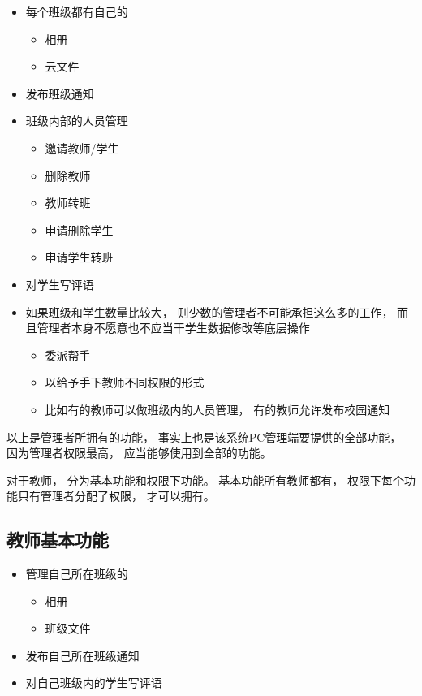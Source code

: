 \begin{itemize}
\item 每个班级都有自己的
\begin{itemize}
	\item 相册
	\item 云文件
\end{itemize}


\item 发布班级通知

\item 班级内部的人员管理

\begin{itemize}
	\item 邀请教师/学生
	\item 删除教师
	\item 教师转班
	\item 申请删除学生
	\item 申请学生转班
\end{itemize}


\item 对学生写评语

\item 如果班级和学生数量比较大， 则少数的管理者不可能承担这么多的工作， 而且管理者本身不愿意也不应当干学生数据修改等底层操作

\begin{itemize}
	\item 委派帮手
	\item 以给予手下教师不同权限的形式
	\item 比如有的教师可以做班级内的人员管理， 有的教师允许发布校园通知	
\end{itemize}
	
\end{itemize}

以上是管理者所拥有的功能， 事实上也是该系统PC管理端要提供的全部功能， 因为管理者权限最高， 应当能够使用到全部的功能。



对于教师， 分为基本功能和权限下功能。 基本功能所有教师都有， 权限下每个功能只有管理者分配了权限， 才可以拥有。

\subsection{教师基本功能}

\begin{itemize}
	\item 管理自己所在班级的
	\begin{itemize}
		\item 相册
		\item 班级文件
	\end{itemize}
	\item 发布自己所在班级通知
	\item 对自己班级内的学生写评语
\end{itemize}



